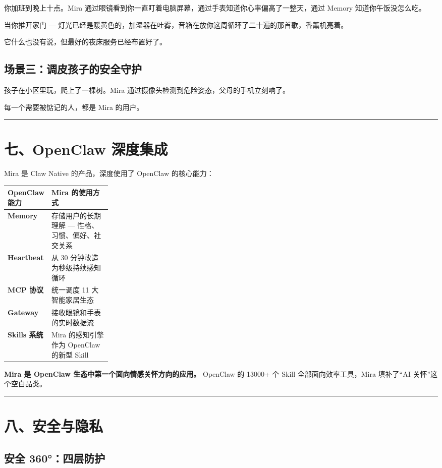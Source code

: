 \documentclass[11pt]{ctexart}
\newcommand{\SectionDivider}{%
  \vspace{0.9em}%
  {\color{MiraMuted}\rule{\linewidth}{0.6pt}}%
  \vspace{1.05em}%
}
\begin{document}
你加班到晚上十点。Mira 通过眼镜看到你一直盯着电脑屏幕，通过手表知道你心率偏高了一整天，通过 Memory 知道你午饭没怎么吃。

当你推开家门 --- 灯光已经是暖黄色的，加湿器在吐雾，音箱在放你这周循环了二十遍的那首歌，香薰机亮着。

它什么也没有说，但最好的夜床服务已经布置好了。

\subsection*{场景三：调皮孩子的安全守护}

孩子在小区里玩，爬上了一棵树。Mira 通过摄像头检测到危险姿态，父母的手机立刻响了。

每一个需要被惦记的人，都是 Mira 的用户。

\SectionDivider

\section*{七、OpenClaw 深度集成}

Mira 是 Claw Native 的产品，深度使用了 OpenClaw 的核心能力：

\begin{tabularx}{\linewidth}{L{0.24\linewidth} Y}
\hline
{}
\textbf{OpenClaw 能力} & \textbf{Mira 的使用方式} \\
\hline
\textbf{Memory} & 存储用户的长期理解 --- 性格、习惯、偏好、社交关系 \\
\textbf{Heartbeat} & 从 30 分钟改造为秒级持续感知循环 \\
\textbf{MCP 协议} & 统一调度 11 大智能家居生态 \\
\textbf{Gateway} & 接收眼镜和手表的实时数据流 \\
\textbf{Skills 系统} & Mira 的感知引擎作为 OpenClaw 的新型 Skill \\
\hline
\end{tabularx}

\textbf{Mira 是 OpenClaw 生态中第一个面向情感关怀方向的应用。} OpenClaw 的 13000+ 个 Skill 全部面向效率工具，Mira 填补了“AI 关怀”这个空白品类。

\SectionDivider

\section*{八、安全与隐私}
\subsection*{安全 360°：四层防护}
\end{document}
